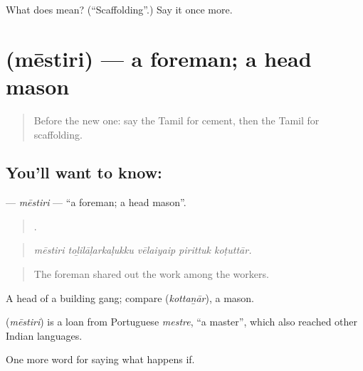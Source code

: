 \begin{tcolorbox}[breakable,colback=teal!4,colframe=teal!35!black,title={Before you move on}]
What does  mean? (\textquotedblleft{}Scaffolding\textquotedblright{}.) Say it once more.
\end{tcolorbox}
\section[\texorpdfstring{\ta{மேஸ்திரி} (mēstiri)}{மேஸ்திரி (mēstiri)}]{ (mēstiri) — a foreman; a head mason}

\label{lesson:TA-C550-mestiri}



\begin{quote}
Before the new one: say the Tamil for cement, then the Tamil for scaffolding.
\end{quote}

\subsection*{You'll want to know: }
\textbf{} — \emph{mēstiri} — \textquotedblleft{}a foreman; a head mason\textquotedblright{}.

\begin{quote}
    .
\end{quote}

\begin{quote}
\emph{mēstiri toḻilāḷarkaḷukku vēlaiyaip pirittuk koṭuttār.}
\end{quote}

\begin{quote}
The foreman shared out the work among the workers.
\end{quote}

A head of a building gang; compare  (\emph{kottaṉār}), a mason.

\begin{cousinweb}
\textbf{} (\emph{mēstiri}) is a loan from Portuguese \emph{mestre}, \textquotedblleft{}a master\textquotedblright{}, which also reached other Indian languages.
\end{cousinweb}

\begin{grammarlens}[title={What you've built}]
One more word for saying what happens if.
\end{grammarlens}

